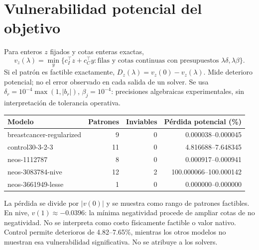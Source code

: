 \documentclass[10pt,a4paper]{article}
\begin{document}
\section*{Vulnerabilidad potencial del objetivo}
Para enteros $z$ fijados y cotas enteras exactas,
\[
v_z(\lambda)=\min_y\{c_I^\top z+c_C^\top y:\text{filas y cotas continuas
con presupuestos }\lambda\delta,\lambda\beta\}.
\]
Si el patrón es factible exactamente, $D_z(\lambda)=v_z(0)-v_z(\lambda)$.
Mide deterioro potencial; no el error observado en cada salida de un solver.
Se usa $\delta_r=10^{-4}\max(1,|b_r|)$, $\beta_j=10^{-4}$: precisiones
algebraicas experimentales, sin interpretación de tolerancia operativa.
\begin{center}\small\begin{tabular}{@{}lrrr@{}}\toprule
Modelo & Patrones & Inviables & Pérdida potencial (\%)\\\midrule
breastcancer-regularized & 9 & 0 & 0.000038--0.000045\\
control30-3-2-3 & 11 & 0 & 4.816688--7.648345\\
neos-1112787 & 8 & 0 & 0.000917--0.000941\\
neos-3083784-nive & 12 & 2 & 100.000066--100.000142\\
neos-3661949-lesse & 1 & 0 & 0.000000--0.000000\\
\bottomrule\end{tabular}\end{center}
La pérdida se divide por $|v(0)|$ y se muestra como rango de patrones factibles.
En nive, $v(1)\approx-0.0396$: la mínima negatividad procede de ampliar cotas de
no negatividad. No se interpreta como costo físicamente factible o valor nativo.
Control permite deterioros de 4.82--7.65\%, mientras los otros modelos no
muestran esa vulnerabilidad significativa. No se atribuye a los solvers.
\newpage
\end{document}
